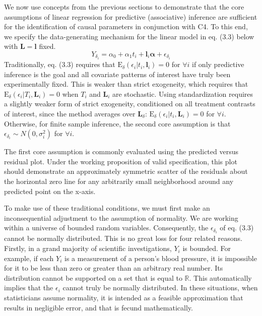 \documentclass[12pt]{amsart}
\theoremstyle{plain}%
\theoremstyle{definition}
\theoremstyle{remark}
\numberwithin{equation}{section}
\begin{document}
We now use concepts from the previous sections to demonstrate that the core assumptions of linear regression for predictive (associative) inference are sufficient for the identification of causal parameters in conjunction with C4. To this end, we specify the data-generating mechanism for the linear model in eq. (3.3) below with $\mathbf{L=l}$ fixed. 
\begin{equation}
Y_{\delta_i} = \alpha_0 + \alpha_1 t_i + \mathbf{l}_i \boldsymbol{\alpha} + \epsilon_{\delta_i}
\end{equation}
Traditionally, eq. (3.3) requires that $\text{E}_{\delta}(\epsilon_i | t_i, \mathbf{l}_i) =0$ for $\forall i$ if only predictive inference is the goal and all covariate patterns of interest have truly been experimentally fixed. This is weaker than strict exogeneity, which requires that $\text{E}_{\delta}(\epsilon_i | T_i, \mathbf{L}_i) =0$ when $T_i$ and $ \mathbf{L}_i$ are stochastic. Using standardization requires a slightly weaker form of strict exogeneity, conditioned on all treatment contrasts of interest, since the method averages over $\mathbf{L}_{\delta}$: $\text{E}_{\delta}(\epsilon_i | t_i, \mathbf{L}_i) =0$ for $\forall i$. Otherwise, for finite sample inference, the second core assumption is that $\epsilon_{\delta_i} \sim N(0, \sigma^2_i)$ for $\forall i$.

The first core assumption is commonly evaluated using the predicted versus residual plot. Under the working proposition of valid specification, this plot should demonstrate an approximately symmetric scatter of the residuals about the horizontal zero line for any arbitrarily small neighborhood around any predicted point on the x-axis.

To make use of these traditional conditions, we must first make an inconsequential adjustment to the assumption of normality. We are working within a universe of bounded random variables. Consequently, the $\epsilon_{\delta_i}$ of eq. (3.3) cannot be normally distributed. This is no great loss for four related reasons. Firstly, in a grand majority of scientific investigations, $Y_{i}$ is bounded. For example, if each $Y_i$ is a measurement of a person's blood pressure, it is impossible for it to be less than zero or greater than an arbitrary real number. Its distribution cannot be supported on a set that is equal to $\mathbb{R}$. This automatically implies that the $\epsilon_i$ cannot truly be normally distributed. In these situations, when statisticians assume normality, it is intended as a feasible approximation that results in negligible error, and that is fecund mathematically.
\end{document}
